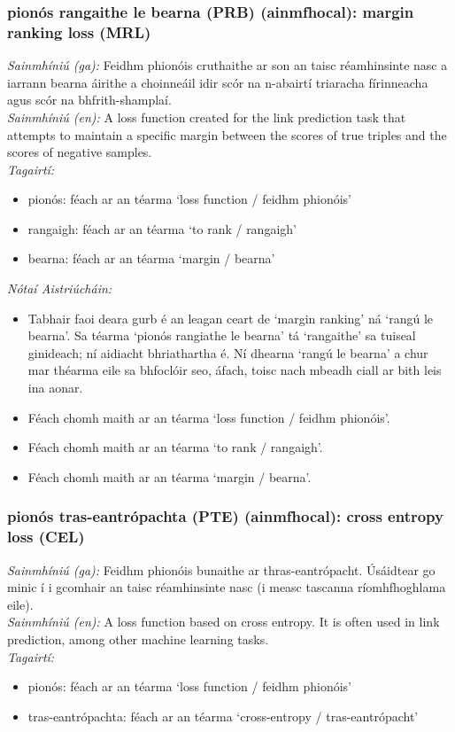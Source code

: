 \subsubsection*{pionós rangaithe le bearna (PRB) (ainmfhocal): margin ranking loss (MRL)}
 \noindent \textit{Sainmhíniú (ga):} Feidhm phionóis cruthaithe ar son an taisc réamhinsinte nasc a iarrann bearna áirithe a choinneáil idir scór na n-abairtí triaracha fírinneacha agus scór na bhfrith-shamplaí.
\\
 \noindent \textit{Sainmhíniú (en):} A loss function created for the link prediction task that attempts to maintain a specific margin between the scores of true triples and the scores of negative samples.
\\
 \noindent \textit{Tagairtí:}
\begin{itemize}
	\item pionós: féach ar an téarma `loss function / feidhm phionóis'
	\item rangaigh: féach ar an téarma `to rank / rangaigh'
	\item bearna: féach ar an téarma `margin / bearna'
\end{itemize}

 \noindent \textit{Nótaí Aistriúcháin:}
\begin{itemize}
	\item Tabhair faoi deara gurb é an leagan ceart de `margin ranking' ná `rangú le bearna'. Sa téarma `pionós rangiathe le bearna' tá `rangaithe' sa tuiseal ginideach; ní aidiacht bhriathartha é. Ní dhearna `rangú le bearna' a chur mar théarma eile sa bhfoclóir seo, áfach, toisc nach mbeadh ciall ar bith leis ina aonar.
	\item Féach chomh maith ar an téarma `loss function / feidhm phionóis'.
	\item Féach chomh maith ar an téarma `to rank / rangaigh'.
	\item Féach chomh maith ar an téarma `margin / bearna'.
\end{itemize}


\subsubsection*{pionós tras-eantrópachta (PTE) (ainmfhocal): cross entropy loss (CEL)}
 \noindent \textit{Sainmhíniú (ga):} Feidhm phionóis bunaithe ar thras-eantrópacht. Úsáidtear go minic í i gcomhair an taisc réamhinsinte nasc (i measc tascanna ríomhfhoghlama eile).
\\
 \noindent \textit{Sainmhíniú (en):} A loss function based on cross entropy. It is often used in link prediction, among other machine learning tasks.
\\
 \noindent \textit{Tagairtí:}
\begin{itemize}
	\item pionós: féach ar an téarma `loss function / feidhm phionóis'
	\item tras-eantrópachta: féach ar an téarma `cross-entropy / tras-eantrópacht'
\end{itemize}

